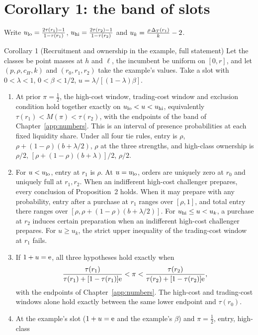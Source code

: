 \section{Corollary 1: the band of slots}\label{sec:example-corollary}

Write \(u_{\rm lo}=\frac{2\tau(r_1)-1}{1-\tau(r_1)}\), \(u_{\rm hi}=\frac{2\tau(r_2)-1}{1-\tau(r_2)}\) and
\(u_k=\frac{\rho\,\Delta_T(r_1)}{k}-2\).

\begin{paperresult}{Corollary 1 (Recruitment and ownership in the example, full statement)}
Let the classes be point masses at \(h\) and \(\ell\), the incumbent be uniform on \([0,r]\), and let
\((p,\rho,c_H,k)\) and \((r_0,r_1,r_2)\) take the example's values. Take a slot with \(0<\lambda<1\),
\(0<\beta<1/2\), \(u=\lambda/[(1-\lambda)\beta]\).
\begin{enumerate}[label=(\alph*),leftmargin=2em]
\item At prior \(\pi=\tfrac12\), the high-cost window, trading-cost window and exclusion condition hold together
  exactly on \(u_{\rm lo}<u<u_{\rm hi}\), equivalently \(\tau(r_1)<M(\pi)<\tau(r_2)\), with the endpoints of the band
  of Chapter~\ref{app:numbers}. This is an interval of presence probabilities at each fixed liquidity share. Under
  all four tie rules, entry is \(\rho\), \(\rho+(1-\rho)(b+\lambda/2)\), \(\rho\) at the three strengths, and
  high-class ownership is \(\rho/2\), \([\rho+(1-\rho)(b+\lambda)]/2\), \(\rho/2\).
\item For \(u<u_{\rm lo}\), entry at \(r_1\) is \(\rho\). At \(u=u_{\rm lo}\), orders are uniquely zero at \(r_0\)
  and uniquely full at \(r_1,r_2\). When an indifferent high-cost challenger prepares, every conclusion of
  Proposition~2 holds. When it may prepare with any probability, entry after a purchase at \(r_1\) ranges over
  \([\rho,1]\), and total entry there ranges over \([\rho,\rho+(1-\rho)(b+\lambda/2)]\). For
  \(u_{\rm hi}\le u<u_k\), a purchase at \(r_2\) induces certain preparation when an indifferent high-cost
  challenger prepares. For \(u\ge u_k\), the strict upper inequality of the trading-cost window at \(r_1\) fails.
\item If \(1+u=\mathrm{e}\), all three hypotheses hold exactly when
  \[
  \frac{\tau(r_1)}{\tau(r_1)+[1-\tau(r_1)]\mathrm{e}}<\pi<\frac{\tau(r_2)}{\tau(r_2)+[1-\tau(r_2)]\mathrm{e}},
  \]
  with the endpoints of Chapter~\ref{app:numbers}. The high-cost and trading-cost windows alone hold exactly
  between the same lower endpoint and \(\tau(r_0)\).
\item At the example's slot (\(1+u=\mathrm{e}\) and the example's \(\beta\)) and \(\pi=\tfrac12\), entry, high-class

\end{enumerate}
\end{paperresult}
